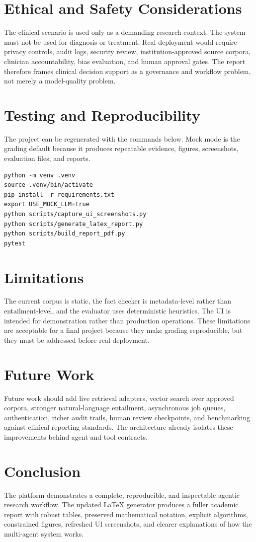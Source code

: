 \documentclass[11pt]{article}
\begin{document}
\section{Ethical and Safety Considerations}
The clinical scenario is used only as a demanding research context. The system must not be used for diagnosis or treatment. Real deployment would require privacy controls, audit logs, security review, institution-approved source corpora, clinician accountability, bias evaluation, and human approval gates. The report therefore frames clinical decision support as a governance and workflow problem, not merely a model-quality problem.

\section{Testing and Reproducibility}
The project can be regenerated with the commands below. Mock mode is the grading default because it produces repeatable evidence, figures, screenshots, evaluation files, and reports.
\begin{lstlisting}[caption={Local verification commands}]
python -m venv .venv
source .venv/bin/activate
pip install -r requirements.txt
export USE_MOCK_LLM=true
python scripts/capture_ui_screenshots.py
python scripts/generate_latex_report.py
python scripts/build_report_pdf.py
pytest
\end{lstlisting}

\section{Limitations}
The current corpus is static, the fact checker is metadata-level rather than entailment-level, and the evaluator uses deterministic heuristics. The UI is intended for demonstration rather than production operations. These limitations are acceptable for a final project because they make grading reproducible, but they must be addressed before real deployment.

\section{Future Work}
Future work should add live retrieval adapters, vector search over approved corpora, stronger natural-language entailment, asynchronous job queues, authentication, richer audit trails, human review checkpoints, and benchmarking against clinical reporting standards. The architecture already isolates these improvements behind agent and tool contracts.

\section{Conclusion}
The platform demonstrates a complete, reproducible, and inspectable agentic research workflow. The updated LaTeX generator produces a fuller academic report with robust tables, preserved mathematical notation, explicit algorithms, constrained figures, refreshed UI screenshots, and clearer explanations of how the multi-agent system works.

\nocite{*}


\end{document}
